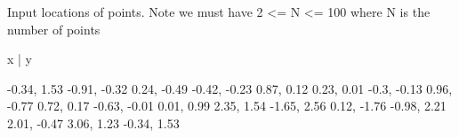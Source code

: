 Input locations of points. Note we must have 2 <= N <= 100 where N is the number of points 

  x   |  y

-0.34, 1.53
-0.91, -0.32
0.24, -0.49
-0.42, -0.23
0.87, 0.12
0.23, 0.01
-0.3, -0.13
0.96, -0.77
0.72, 0.17
-0.63, -0.01
0.01, 0.99
2.35, 1.54
-1.65, 2.56
0.12, -1.76
-0.98, 2.21
2.01, -0.47
3.06, 1.23
-0.34, 1.53


